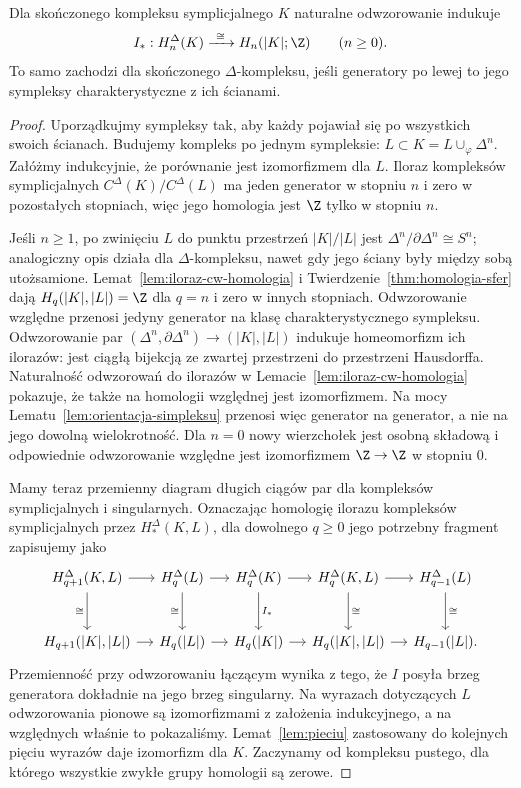 \begin{twierdzenie}
\label{thm:symplicjalna-singularna}
Dla skończonego kompleksu symplicjalnego
$K$ naturalne odwzorowanie indukuje
\[
 I_*:H_n^\Delta(K)\xrightarrow{\ \cong\ }
 H_n(|K|;\Z)
 \qquad(n\geq0).
\]
To samo zachodzi dla skończonego
$\Delta$-kompleksu, jeśli generatory
po lewej to jego sympleksy
charakterystyczne z ich ścianami.
\end{twierdzenie}
\begin{proof}
Uporządkujmy sympleksy tak, aby
każdy pojawiał się po wszystkich
swoich ścianach. Budujemy kompleks
po jednym sympleksie:
$L\subset K=L\cup_\varphi\Delta^n$.
Załóżmy indukcyjnie, że porównanie
jest izomorfizmem dla $L$.
Iloraz kompleksów symplicjalnych
$C^\Delta(K)/C^\Delta(L)$
ma jeden generator w stopniu $n$
i zero w pozostałych stopniach,
więc jego homologia jest $\Z$
tylko w stopniu $n$.

Jeśli $n\geq1$, po zwinięciu $L$
do punktu przestrzeń $|K|/|L|$
jest $\Delta^n/\partial\Delta^n
\cong S^n$; analogiczny opis
działa dla $\Delta$-kompleksu,
nawet gdy jego ściany były
między sobą utożsamione.
Lemat~\ref{lem:iloraz-cw-homologia}
i Twierdzenie~\ref{thm:homologia-sfer}
dają $H_q(|K|,|L|)=\Z$ dla
$q=n$ i zero w innych stopniach.
Odwzorowanie względne przenosi jedyny
generator na klasę charakterystycznego sympleksu.
Odwzorowanie par $(\Delta^n,\partial\Delta^n)\to(|K|,|L|)$
indukuje homeomorfizm ich ilorazów: jest ciągłą bijekcją
ze zwartej przestrzeni do przestrzeni Hausdorffa.
Naturalność odwzorowań do ilorazów w Lemacie~\ref{lem:iloraz-cw-homologia}
pokazuje, że także na homologii względnej jest izomorfizmem.
Na mocy Lematu~\ref{lem:orientacja-simpleksu} przenosi więc
generator na generator, a nie na jego dowolną wielokrotność.
Dla $n=0$ nowy wierzchołek jest
osobną składową i odpowiednie
odwzorowanie względne jest izomorfizmem
$\Z\to\Z$ w stopniu $0$.

Mamy teraz przemienny diagram
długich ciągów par dla kompleksów
symplicjalnych i singularnych.
Oznaczając homologię ilorazu kompleksów symplicjalnych przez
$H_*^\Delta(K,L)$, dla dowolnego $q\geq0$ jego potrzebny fragment zapisujemy jako
\[
\begin{tikzcd}[column sep=small,row sep=large]
 H_{q+1}^\Delta(K,L) \arrow[r] \arrow[d,"\cong" left]
 &H_q^\Delta(L) \arrow[r] \arrow[d,"\cong" left]
 &H_q^\Delta(K) \arrow[r] \arrow[d,"I_*"]
 &H_q^\Delta(K,L) \arrow[r] \arrow[d,"\cong" right]
 &H_{q-1}^\Delta(L) \arrow[d,"\cong" right]\\
 H_{q+1}(|K|,|L|) \arrow[r]
 &H_q(|L|) \arrow[r]
 &H_q(|K|) \arrow[r]
 &H_q(|K|,|L|) \arrow[r]
 &H_{q-1}(|L|).
\end{tikzcd}
\]
Przemienność przy odwzorowaniu łączącym wynika z tego, że
$I$ posyła brzeg generatora dokładnie na jego brzeg singularny.
Na wyrazach dotyczących $L$
odwzorowania pionowe są izomorfizmami
z założenia indukcyjnego,
a na względnych właśnie
to pokazaliśmy. Lemat~\ref{lem:pieciu}
zastosowany do kolejnych pięciu
wyrazów daje izomorfizm dla $K$.
Zaczynamy od kompleksu pustego,
dla którego wszystkie zwykłe
grupy homologii są zerowe.
\end{proof}


